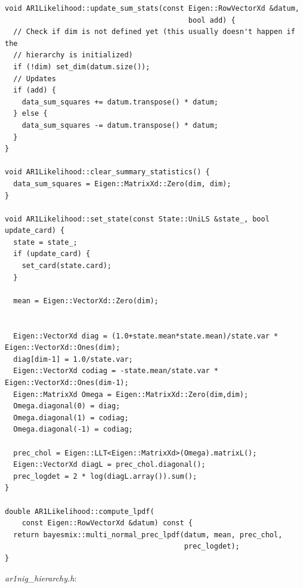 \documentclass[12pt,a4paper]{article}
\begin{document}
\begin{lstlisting} 
void AR1Likelihood::update_sum_stats(const Eigen::RowVectorXd &datum,
                                           bool add) {
  // Check if dim is not defined yet (this usually doesn't happen if the
  // hierarchy is initialized)
  if (!dim) set_dim(datum.size());
  // Updates
  if (add) {
    data_sum_squares += datum.transpose() * datum;
  } else {
    data_sum_squares -= datum.transpose() * datum;
  }
}

void AR1Likelihood::clear_summary_statistics() {
  data_sum_squares = Eigen::MatrixXd::Zero(dim, dim);
}

void AR1Likelihood::set_state(const State::UniLS &state_, bool update_card) {
  state = state_;
  if (update_card) {
    set_card(state.card);
  }

  mean = Eigen::VectorXd::Zero(dim);


  Eigen::VectorXd diag = (1.0+state.mean*state.mean)/state.var * Eigen::VectorXd::Ones(dim);
  diag[dim-1] = 1.0/state.var;
  Eigen::VectorXd codiag = -state.mean/state.var * Eigen::VectorXd::Ones(dim-1);
  Eigen::MatrixXd Omega = Eigen::MatrixXd::Zero(dim,dim);
  Omega.diagonal(0) = diag;
  Omega.diagonal(1) = codiag;
  Omega.diagonal(-1) = codiag;

  prec_chol = Eigen::LLT<Eigen::MatrixXd>(Omega).matrixL();
  Eigen::VectorXd diagL = prec_chol.diagonal();
  prec_logdet = 2 * log(diagL.array()).sum();
}

double AR1Likelihood::compute_lpdf(
    const Eigen::RowVectorXd &datum) const {
  return bayesmix::multi_normal_prec_lpdf(datum, mean, prec_chol,
                                          prec_logdet);
}

\end{lstlisting}
\textit{ar1nig\_hierarchy.h}:
\end{document}
